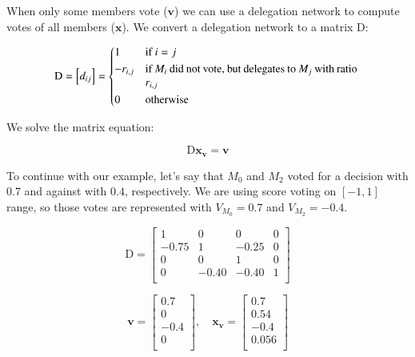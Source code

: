 \documentclass{sigchi}
\begin{document}
When only some members vote ($\mathbf{v}$) we can use a delegation network to compute votes
of all members ($\mathbf{x}$).
We convert a delegation network to a matrix $\mathrm{D}$:

\begin{displaymath}
\mathrm{D} = \left[d_{ij}\right] = \begin{dcases*}
 1 & if $i = j$ \\
 -r_{i,j} & \parbox[t]{.55\columnwidth}{if $M_i$ did not vote, but delegates to $M_j$ with ratio $r_{i,j}$} \\
 0 & otherwise \\
\end{dcases*}
\end{displaymath}

We solve the matrix equation:

\begin{displaymath}
\mathrm{D} \mathbf{x_v} = \mathbf{v}
\end{displaymath}

To continue with our example, let's say that $M_0$ and $M_2$ voted for a decision with $0.7$ and against with $0.4$,
respectively.
We are using score voting on $[-1, 1]$ range, so those votes are represented with $V_{M_0} = 0.7$ and
$V_{M_2} = -0.4$.

\begin{displaymath}
\mathrm{D} = \left[ \begin{array}{cccc}
1 & 0 & 0 & 0 \\
-0.75 & 1 & -0.25 & 0 \\
0 & 0 & 1 & 0 \\
0 & -0.40 & -0.40 & 1 \\
\end{array} \right]
\end{displaymath}

\begin{displaymath}
\mathbf{v} = \left[ \begin{array}{c}
0.7 \\
0 \\
-0.4 \\
0 \\
\end{array} \right],\quad \mathbf{x_v} = \left[ \begin{array}{c}
0.7 \\
0.54 \\
-0.4 \\
0.056 \\
\end{array} \right]
\end{displaymath}
\end{document}
